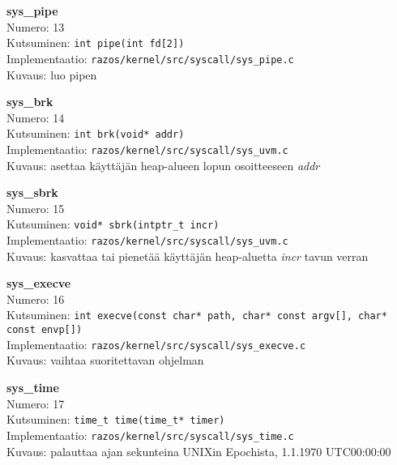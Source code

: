 \textbf{sys\_pipe}\\
Numero: 13\\
Kutsuminen: \texttt{int pipe(int fd[2])}\\
Implementaatio: \texttt{razos/kernel/src/syscall/sys\_pipe.c}\\
Kuvaus: luo pipen

\textbf{sys\_brk}\\
Numero: 14\\
Kutsuminen: \texttt{int brk(void* addr)}\\
Implementaatio: \texttt{razos/kernel/src/syscall/sys\_uvm.c}\\
Kuvaus: asettaa käyttäjän heap-alueen lopun osoitteeseen \textit{addr}

\textbf{sys\_sbrk}\\
Numero: 15\\
Kutsuminen: \texttt{void* sbrk(intptr\_t incr)}\\
Implementaatio: \texttt{razos/kernel/src/syscall/sys\_uvm.c}\\
Kuvaus: kasvattaa tai pienetää käyttäjän heap-aluetta \textit{incr} tavun verran

\textbf{sys\_execve}\\
Numero: 16\\
Kutsuminen: \texttt{int execve(const char* path, char* const argv[], char* const envp[])}\\
Implementaatio: \texttt{razos/kernel/src/syscall/sys\_execve.c}\\
Kuvaus: vaihtaa suoritettavan ohjelman

\textbf{sys\_time}\\
Numero: 17\\
Kutsuminen: \texttt{time\_t time(time\_t* timer)}\\
Implementaatio: \texttt{razos/kernel/src/syscall/sys\_time.c}\\
Kuvaus: palauttaa ajan sekunteina UNIXin Epochista, 1.1.1970 UTC00:00:00
